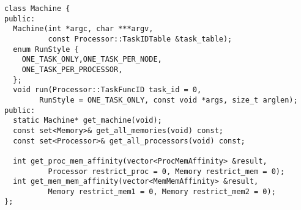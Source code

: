 \begin{lstlisting}[float={t},label={lst:machineapi},caption={Machine Interface.}]
class Machine {
public:
  Machine(int *argc, char ***argv,
          const Processor::TaskIDTable &task_table);
  enum RunStyle {
    ONE_TASK_ONLY,ONE_TASK_PER_NODE,
    ONE_TASK_PER_PROCESSOR,
  };
  void run(Processor::TaskFuncID task_id = 0, 
        RunStyle = ONE_TASK_ONLY, const void *args, size_t arglen);
public:
  static Machine* get_machine(void);
  const set<Memory>& get_all_memories(void) const;
  const set<Processor>& get_all_processors(void) const;

  int get_proc_mem_affinity(vector<ProcMemAffinity> &result,
          Processor restrict_proc = 0, Memory restrict_mem = 0);
  int get_mem_mem_affinity(vector<MemMemAffinity> &result,
          Memory restrict_mem1 = 0, Memory restrict_mem2 = 0);
};
\end{lstlisting}


